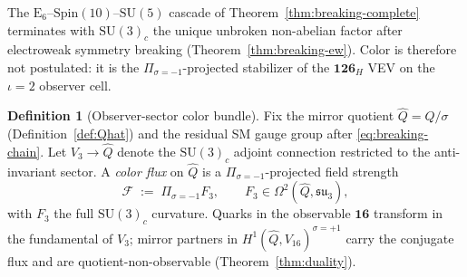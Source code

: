 \documentclass[aps,prd,onecolumn,amsmath,amssymb,nofootinbib,11pt]{revtex4-2}
\numberwithin{equation}{section}
\theoremstyle{plain}
\theoremstyle{definition}
\newtheorem{definition}[theorem]{Definition}
\theoremstyle{remark}
\newcommand{\E}[1]{\mathrm{E}_{#1}}
\newcommand{\Spin}{\mathrm{Spin}}
\begin{document}
The $\E{6}$--$\Spin(10)$--$\mathrm{SU}(5)$ cascade of
Theorem~\ref{thm:breaking-complete} terminates with $\mathrm{SU}(3)_c$ the
unique unbroken non-abelian factor after electroweak symmetry breaking
(Theorem~\ref{thm:breaking-ew}). Color is therefore not postulated: it is the
$\Pi_{\sigma=-1}$-projected stabilizer of the $\mathbf{126}_H$ VEV on the
$\iota=2$ observer cell.

\begin{definition}[Observer-sector color bundle]\label{def:color-bundle}
Fix the mirror quotient $\hat Q=Q/\sigma$ (Definition~\ref{def:Qhat}) and
the residual SM gauge group after \eqref{eq:breaking-chain}. Let
$V_3\to\hat Q$ denote the $\mathrm{SU}(3)_c$ adjoint connection restricted to
the anti-invariant sector. A \emph{color flux} on $\hat Q$ is a
$\Pi_{\sigma=-1}$-projected field strength
\begin{equation}\label{eq:color-flux}
  \mathcal{F}
  \;:=\;
  \Pi_{\sigma=-1} F_3,
  \qquad
  F_3 \in \Omega^2(\hat Q, \mathfrak{su}_3),
\end{equation}
with $F_3$ the full $\mathrm{SU}(3)_c$ curvature. Quarks in the observable
$\mathbf{16}$ transform in the fundamental of $V_3$; mirror partners in
$H^1(\hat Q,V_{16})^{\sigma=+1}$ carry the conjugate flux and are
quotient-non-observable (Theorem~\ref{thm:duality}).
\end{definition}
\end{document}
